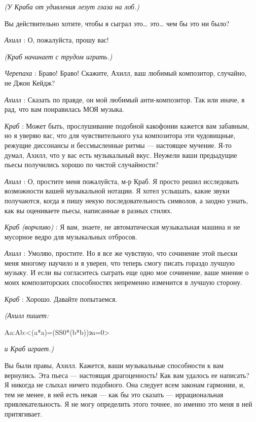 \documentclass[../main.tex]{subfiles}
\begin{document}
\begin{dialogue}
\emph{(У Краба от удивления лезут глаза на лоб.)}

Вы действительно хотите, чтобы я сыграл это\ldots{} это\ldots{} чем бы это ни было?

\emph{Ахилл} : О, пожалуйста, прошу вас!

\emph{(Краб начинает с трудом играть.)}

\emph{Черепаха} : Браво! Браво! Скажите, Ахилл, ваш любимый композитор, случайно, не Джон Кейдж?

\emph{Ахилл} : Сказать по правде, он мой любимый анти-композитор. Так или иначе, я рад, что вам понравилась МОЯ музыка.

\emph{Краб} : Может быть, прослушивание подобной какофонии кажется вам забавным, но я уверяю вас, что для чувствительного уха композитора эти чудовищные, режущие диссонансы и бессмысленные ритмы --- настоящее мучение. Я-то думал, Ахилл, что у вас есть музыкальный вкус. Неужели ваши предыдущие пьесы получились хорошо по чистой случайности?

\emph{Ахилл} : О, простите меня пожалуйста, м-р Краб. Я просто решил исследовать возможности вашей музыкальной нотации. Я хотел услышать, какие звуки получаются, когда я пишу некую последовательность символов, а заодно узнать, как вы оцениваете пьесы, написанные в разных стилях.

\emph{Краб (ворчливо)} : Я вам, знаете, не автоматическая музыкальная машина и не мусорное ведро для музыкальных отбросов.

\emph{Ахилл} : Умоляю, простите. Но я все же чувствую, что сочинение этой пьески меня многому научило и я уверен, что теперь смогу писать гораздо лучшую музыку. И если вы согласитесь сыграть еще одно мое сочинение, ваше мнение о моих композиторских способностях непременно изменится в лучшую сторону.

\emph{Краб} : Хорошо. Давайте попытаемся.

\emph{(Ахилл пишет:}

Aa:Ab:\textless(a*a)=(SS0*(b*b))эa=0\textgreater{}

\emph{и Краб играет.)}

Вы были правы, Ахилл. Кажется, ваши музыкальные способности к вам вернулись. Эта пьеса --- настоящая драгоценность! Как вам удалось ее написать? Я никогда не слыхал ничего подобного. Она следует всем законам гармонии, и, тем не менее, в ней есть некая --- как бы это сказать --- иррациональная привлекательность. Я не могу определить этого точнее, но именно это меня в ней притягивает.


\end{dialogue}
\end{document}
